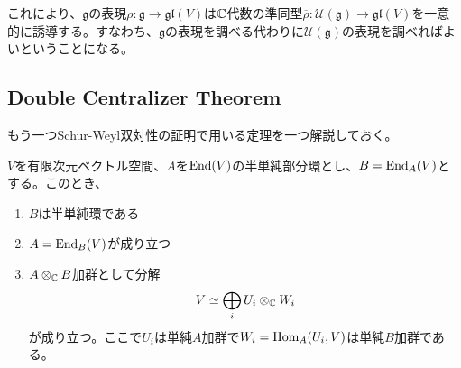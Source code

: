 \documentclass{ltjsreport}
\begin{document}
これにより、$\mathfrak{g}$の表現$\rho:\mathfrak{g}\rightarrow \mathfrak{gl}(V)$は$\mathbb{C}$代数の準同型$\overline{\rho}:\mathcal{U}(\mathfrak{g})\rightarrow \mathfrak{gl}(V)$を一意的に誘導する。すなわち、$\mathfrak{g}$の表現を調べる代わりに$\mathcal{U}(\mathfrak{g})$の表現を調べればよいということになる。


\subsection{Double Centralizer Theorem}

もう一つSchur-Weyl双対性の証明で用いる定理を一つ解説しておく。

\begin{theo}\label{DCT}
  $V$を有限次元ベクトル空間、$A$を$\text{End}(V)$の半単純部分環とし、$B=\text{End}_A(V)$とする。このとき、
  \begin{enumerate}
    \item $B$は半単純環である
    \item $A=\text{End}_B(V)$が成り立つ
    \item $A\otimes_{\mathbb{C}} B$加群として分解
    \[
      V\simeq \bigoplus_iU_i\otimes_{\mathbb{C}} W_i  
    \]
    が成り立つ。ここで$U_i$は単純$A$加群で$W_i=\text{Hom}_A(U_i,V)$は単純$B$加群である。
  \end{enumerate}
\end{theo}
\end{document}
